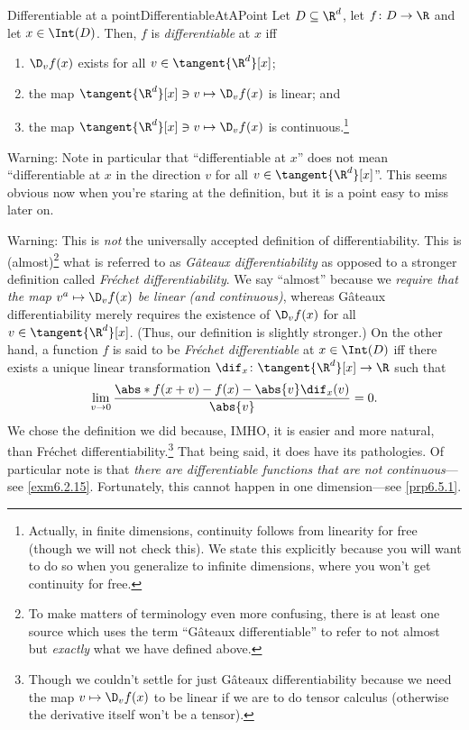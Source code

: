 \begin{dfn}{Differentiable at a point}{DifferentiableAtAPoint}
Let $D\subseteq \R ^d$, let $f\colon D\rightarrow \R$ and let $x\in \Int (D)$.  Then, $f$ is \emph{differentiable} at $x$ iff
\begin{enumerate}
\item $\D _vf(x)$ exists for all $v\in \tangent{\R ^d}[x]$;
\item the map $\tangent{\R ^d}[x]\ni v\mapsto \D _vf(x)$ is linear; and
\item the map $\tangent{\R ^d}[x]\ni v \mapsto \D _vf(x)$ is continuous.\footnote{Actually, in finite dimensions, continuity follows from linearity for free (though we will not check this).  We state this explicitly because you will want to do so when you generalize to infinite dimensions, where you won't get continuity for free.}
\end{enumerate}
\begin{wrn}
Warning:  Note in particular that ``differentiable at $x$'' does not mean ``differentiable at $x$ in the direction $v$ for all $v\in \tangent{\R ^d}[x]$''.  This seems obvious now when you're staring at the definition, but it is a point easy to miss later on.
\end{wrn}
\begin{wrn}
Warning:  This is \emph{not} the universally accepted definition of differentiability.  This is (almost)\footnote{To make matters of terminology even more confusing, there is at least one source \cite[pg.~117]{Drabek} which uses the term ``Gâteaux differentiable'' to refer to not almost but \emph{exactly} what we have defined above.} what is referred to as \emph{Gâteaux differentiability} as opposed to a stronger definition called \emph{Fréchet differentiability}.  We say ``almost'' because we \emph{require that the map $v^a\mapsto \D _vf(x)$ be linear (and continuous)}, whereas Gâteaux differentiability merely requires the existence of $\D _vf(x)$ for all $v\in \tangent{\R ^d}[x]$.  (Thus, our definition is slightly stronger.)  On the other hand, a function $f$ is said to be \emph{Fréchet differentiable} at $x\in \Int (D)$ iff there exists a unique linear transformation $\dif _x\colon \tangent{\R ^d}[x]\rightarrow \R$ such that
\begin{equation}
\lim _{v\to 0}\frac{\abs*{f(x+v)-f(x)-\abs{v}\dif _x(v)}}{\abs{v}}=0.
\end{equation}
We chose the definition we did because, IMHO, it is easier and more natural, than Fréchet differentiability.\footnote{Though we couldn't settle for just Gâteaux differentiability because we need the map $v\mapsto \D _vf(x)$ to be linear if we are to do tensor calculus (otherwise the derivative itself won't be a tensor).}  That being said, it does have its pathologies.  Of particular note is that \emph{there are differentiable functions that are not continuous}---see \cref{exm6.2.15}.  Fortunately, this cannot happen in one dimension---see \cref{prp6.5.1}.

\end{wrn}
\end{dfn}
